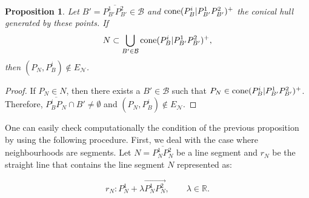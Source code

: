 \documentclass[a4paper,  review, authoryear, 1p., doubleblind]{elsarticle}
\newcommand{\EN}{{E^{}_{\mathcal N}}}
\newtheorem{prop}{Proposition}
\begin{document}
	\begin{prop}
		
		Let $B'=\overline{P^1_{B'}P^2_{B'}}\in\mathcal B$ and $\normalfont{\text{cone}}(P^i_B|P^1_{B'}P^2_{B'})^+$ the conical hull generated by these points. If
		$$N\subset\bigcup_{B'\in\mathcal B}\normalfont{\text{cone}}(P^i_B| P^1_{B'}P^2_{B'})^+,$$
		then $(P^{}_N, P^i_B)\not\in \EN$.
		
	\end{prop}
	\begin{proof}
		If $P_N\in N$, then there exists a $B'\in\mathcal B$ such that 
		$P_N\in \normalfont{\text{cone}}(P^i_B|P^1_{B'}P^2_{B'})^+$. Therefore, $\overline{P^i_B P^{}_N}\cap B'\neq\emptyset$ and $(P^{}_N, P^i_B)\not\in \EN$.
	\end{proof}
	
	One can easily check computationally the condition of the previous proposition by using the following procedure. First, we deal with the case where neighbourhoods are segments. Let $N = \overline{P^1_N P^2_N}$ be a line segment and $r_N$ be the straight line that contains the line segment $N$ represented as:
	
	$$r_N:P_N^1+\lambda\overrightarrow{P_N^1P_N^2},\qquad\lambda\in\mathbb R.$$
	
\end{document}
